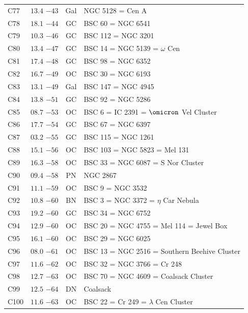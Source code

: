 \begin{table}[t]
\begin{tabularx}{\linewidth}{lccX}
C77  &$13.4$ $-43$&Gal&NGC 5128 = Cen A\\
C78  &$18.1$ $-44$&GC &BSC 60 = NGC 6541\\
C79  &$10.3$ $-46$&GC &BSC 112 = NGC 3201\\
C80  &$13.4$ $-47$&GC &BSC 14 = NGC 5139 = $\omega$ Cen\\
C81  &$17.4$ $-48$&GC &BSC 98 = NGC 6352\\
C82  &$16.7$ $-49$&OC &BSC 30 = NGC 6193\\
C83  &$13.1$ $-49$&Gal&BSC 147 = NGC 4945\\
C84  &$13.8$ $-51$&GC &BSC 92 = NGC 5286\\
C85  &$08.7$ $-53$&OC &BSC 6 = IC 2391 = $\omicron$ Vel Cluster\\
C86  &$17.7$ $-54$&GC &BSC 67 = NGC 6397\\
C87  &$03.2$ $-55$&GC &BSC 115 = NGC 1261\\
C88  &$15.1$ $-56$&OC &BSC 103 = NGC 5823 = Mel 131\\
C89  &$16.3$ $-58$&OC &BSC 33 = NGC 6087 = S Nor Cluster\\
C90  &$09.4$ $-58$&PN &NGC 2867\\
C91  &$11.1$ $-59$&OC &BSC 9 = NGC 3532\\
C92  &$10.8$ $-60$&BN &BSC 3 = NGC 3372 = $\eta$ Car Nebula\\
C93  &$19.2$ $-60$&GC &BSC 34 = NGC 6752\\
C94  &$12.9$ $-60$&OC &BSC 20 = NGC 4755 = Mel 114 = Jewel Box\\
C95  &$16.1$ $-60$&OC &BSC 29 = NGC 6025\\
C96  &$08.0$ $-61$&OC &BSC 13 = NGC 2516 = Southern Beehive Cluster\\
C97  &$11.6$ $-62$&OC &BSC 32 = NGC 3766 = Cr 248\\
C98  &$12.7$ $-63$&OC &BSC 70 = NGC 4609 = Coalsack Cluster\\
C99  &$12.5$ $-64$&DN &Coalsack\\
C100 &$11.6$ $-63$&OC &BSC 22 = Cr 249 = $\lambda$ Cen Cluster\\

        \hline
    \end{tabularx}
\end{table}
\clearpage


